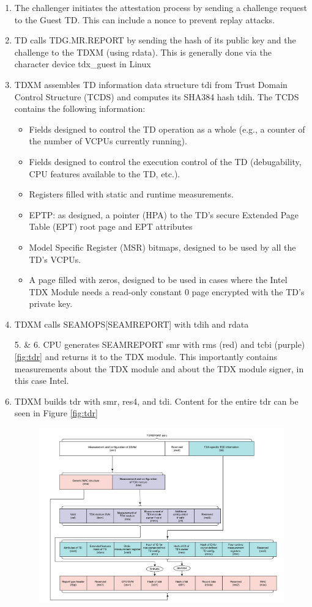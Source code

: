 \begin{enumerate}
\item The challenger initiates the attestation process by sending a challenge request to the Guest TD. This can include a nonce to prevent replay attacks\cite{sardar_formal_2023}.
\item TD calls TDG.MR.REPORT by sending the hash of its public key and the challenge to the TDXM (using rdata). This is generally done via the character device tdx\_guest in Linux
\item TDXM assembles TD information data structure tdi from Trust Domain Control Structure (TCDS) and computes its SHA384 hash tdih. The TCDS contains the following information:
\begin{itemize}
    \item Fields designed to control the TD operation as a whole (e.g., a counter of the number of VCPUs currently running). 
    \item Fields designed to control the execution control of the TD (debugability, CPU features available to the TD, etc.). 
    \item Registers filled with static and runtime measurements. 
    \item EPTP: as designed, a pointer (HPA) to the TD’s secure Extended Page Table (EPT) root page and EPT attributes
    \item Model Specific Register (MSR) bitmaps, designed to be used by all the TD’s VCPUs. 
    \item A page filled with zeros, designed to be used in cases where the Intel TDX Module needs a read-only constant 0 page encrypted with the TD’s private key.
\end{itemize}
\item TDXM calls SEAMOPS[SEAMREPORT] with tdih and rdata
\item[5. \& 6.] CPU generates SEAMREPORT smr  with rms (red) and tcbi (purple) \ref{fig:tdr} and returns it to the TDX module. This importantly contains measurements about the TDX module and about the TDX module signer, in this case Intel.
\item TDXM builds tdr with smr, res4, and tdi. Content for the entire tdr can be seen in Figure \ref{fig:tdr}
\begin{figure}
\centering
\includegraphics[width=\textwidth]{figures/tdr.png}

\end{figure}
\end{enumerate}
